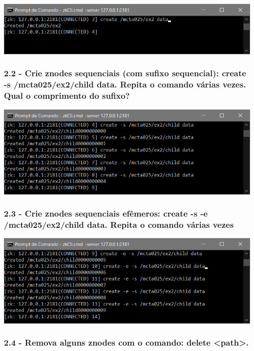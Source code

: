 \includegraphics{pratica3/prints/roteiro 2.1.PNG}

\subsubsection{2.2 - Crie znodes sequenciais (com sufixo sequencial): create -s
/mcta025/ex2/child data. Repita o comando várias vezes. Qual o
comprimento do sufixo?}

\includegraphics{pratica3/prints/roteiro 2.2.PNG}

\subsubsection{2.3 - Crie znodes sequenciais efêmeros: create -s -e
/mcta025/ex2/child data. Repita o comando várias vezes}

\includegraphics{pratica3/prints/roteiro 2.3.PNG}

\subsubsection{2.4 - Remova alguns znodes com o comando: delete <path>.}

